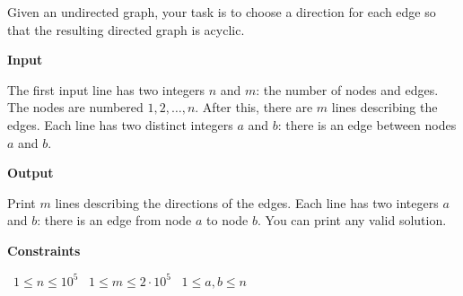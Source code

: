 Given an undirected graph, your task is to choose a direction for each edge so that the resulting directed graph is acyclic.

\vspace{0.3cm}\noindent\textbf{Input}

The first input line has two integers $n$ and $m$: the number of nodes and edges. The nodes are numbered $1,2,\dots,n$.
After this, there are $m$ lines describing the edges. Each line has two distinct integers $a$ and $b$: there is an edge between nodes $a$ and $b$.

\vspace{0.3cm}\noindent\textbf{Output}

Print $m$ lines describing the directions of the edges. Each line has two integers $a$ and $b$: there is an edge from node $a$ to node $b$. You can print any valid solution.

\vspace{0.3cm}\noindent\textbf{Constraints}

\textbullet\ $1 \le n \le 10^5$
\textbullet\ $1 \le m \le 2 \cdot 10^5$
\textbullet\ $1 \le a,b \le n$